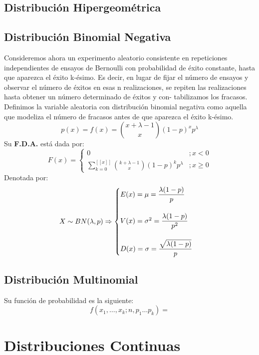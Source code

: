 \subsection{Distribución Hipergeométrica}
\subsection{Distribución Binomial Negativa}
Consideremos ahora un experimento aleatorio consistente en repeticiones independientes de
ensayos de Bernoulli con probabilidad de éxito constante, hasta que aparezca el éxito k-ésimo.
Es decir, en lugar de fijar el número de ensayos y observar el número de éxitos en esas n
realizaciones, se repiten las realizaciones hasta obtener un número determinado de éxitos y con-
tabilizamos los fracasos. Definimos la variable aleatoria con
distribución binomial negativa
como aquella que modeliza el número de fracasos antes de que aparezca el éxito k-ésimo.
$$
p(x)=f(x)=\binom{x+\lambda-1}{x} (1-p)^x p^\lambda
$$
Su \textbf{F.D.A.} está dada por:
$$
F(x)=
\begin{cases}
0 &; x<0 \\
\displaystyle\sum_{k=0}^{[\![ x ]\!]} \binom{k+\lambda-1}{x} (1-p)^k p^\lambda &; x\geq 0
\end{cases}
$$
Denotada por:
$$
X\sim BN(\lambda,p)\Rightarrow
\begin{cases}
E(x)=\mu= \dfrac{\lambda(1-p)}{p} \\ \vspace{0.01cm} \\
V(x)=\sigma^2 = \dfrac{\lambda (1-p)}{p^2}\\ \vspace{0.01cm} \\
D(x)=\sigma= \dfrac{\sqrt{\lambda (1-p)}}{p}
\end{cases}
$$
\subsection{Distribución Multinomial}
Su función de probabilidad es la siguiente:
$$
f(x_1,\ldots ,x_k;n,p_1\ldots p_k)=
$$
\section{Distribuciones Continuas}
